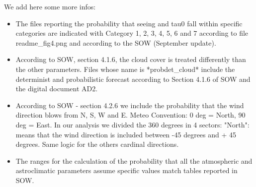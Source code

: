 \documentclass[11pt,english]{article}
\begin{document}
We add here some more infos:
\begin{itemize}
\item  The files reporting the probability that seeing and tau0 fall within specific categories are indicated with Category 1, 2, 3, 4, 5, 6 and 7 according to file readme\_fig4.png and according to the SOW (September update).
\item According to SOW, section 4.1.6, the cloud cover is treated differently than the other parameters. Files whose name is *probdet\_cloud* include the determinist and probabilistic forecast according to Section 4.1.6 of SOW and the digital document AD2.
\item According to SOW - section 4.2.6 we include the probability that the wind direction blows from N, S, W and E. Meteo Convention: 0 deg = North, 90 deg = East. In our analysis we divided the 360 degrees in 4 sectors: "North": means that the wind direction is included between -45 degrees and + 45 degrees. Same logic for the others cardinal directions.
\item  The ranges for the calculation of the probability that all the atmospheric and astroclimatic parameters assume specific values match tables reported in SOW.
\end{itemize}


\end{document}
